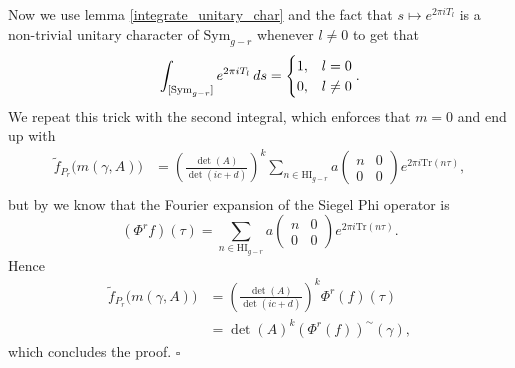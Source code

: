 Now we use lemma \ref{integrate_unitary_char} and the fact that 
\(s\mapsto  e^{2\pi iT_l} \)
is a non-trivial unitary character of \(\mathrm{Sym}_{g-r}\) whenever \(l\neq 0\) to get that 
\[\int^{}_{[\mathrm{Sym}_{g-r}]}  e^{2\pi iT_l}  \,ds = \begin{cases}
	1, & l=0 \\
	0, & l\neq 0
\end{cases}.\]
We repeat this trick with the second integral, which enforces that \(m = 0\) and end up with 
\begin{align*}
	\tilde f_{P_r}\bigl(m(\gamma, A)\bigr)
	&=\left(\frac{\det(A)}{\det(ic + d)}\right)^{k} \sum_{n\in\mathrm{HI}_{g-r}} a\begin{pmatrix} n & 0\\ 0 & 0 \end{pmatrix}e^{2\pi i \mathrm{Tr} (n\tau)},\\
\end{align*}
but by \cite[3.5]{bruinier123ModularForms2008} we know that the Fourier expansion of the Siegel Phi operator is 
\[(\Phi^{r} f)(\tau) = \sum_{n\in\mathrm{HI}_{g-r}} a\begin{pmatrix} n & 0\\ 0 & 0 \end{pmatrix} e^{2\pi i\mathrm{Tr}(n \tau)}.\]
Hence 
\begin{align*}
	\tilde f_{P_r}\bigl(m(\gamma, A)\bigr)
	&=\left(\frac{\det(A)}{\det(ic + d)}\right)^{k} \Phi^r(f)(\tau)\\
	&= \det(A)^k (\Phi^r(f))^{\sim}(\gamma),
\end{align*}
which concludes the proof. \hspace{100mm}\(\square\)

